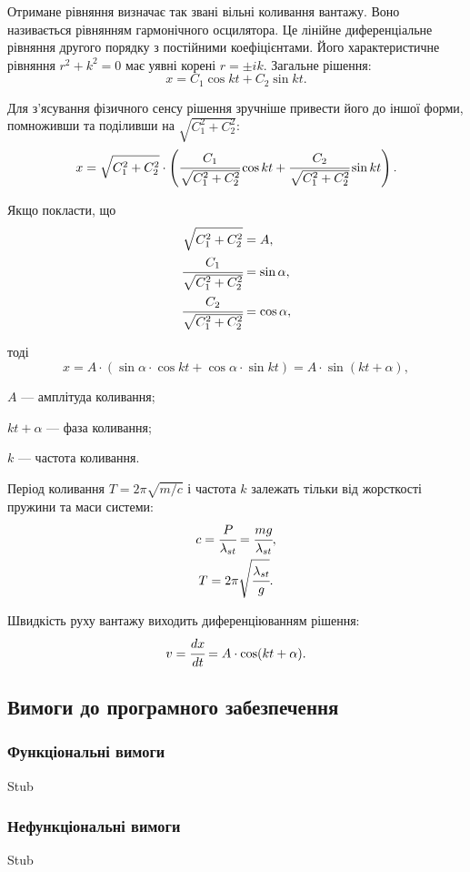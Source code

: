 Отримане рівняння визначає так звані вільні коливання вантажу.
Воно називається рівнянням гармонічного осцилятора.
Це лінійне диференціальне рівняння другого порядку з постійними коефіцієнтами.
Його характеристичне рівняння $r^2 + k^2 = 0$ має уявні корені $r=\pm ik$.
Загальне рішення:
\[
x = C_1 \cos kt + C_2 \sin kt.
\]

Для з'ясування фізичного сенсу рішення зручніше привести його до іншої форми, помноживши та поділивши на $\sqrt{C_1^2 + C_2^2}$:
\[
x = \sqrt{C_1^2 + C_2^2} \cdot \left( \cfrac{C_1}{\sqrt{C_1^2 + C_2^2}} \cos kt + \cfrac{C_2}{\sqrt{C_1^2 + C_2^2}} \sin kt \right).
\]

Якщо покласти, що
\begin{align*}
\sqrt{C_1^2 + C_2^2} &= A, \\
\cfrac{C_1}{\sqrt{C_1^2 + C_2^2}} &= \sin \alpha, \\
\cfrac{C_2}{\sqrt{C_1^2 + C_2^2}} &= \cos \alpha,
\end{align*}

тоді
\[
x = A \cdot (\sin\alpha \cdot \cos kt + \cos\alpha \cdot \sin kt) = A \cdot \sin (kt + \alpha),
\]
\begin{description}
\item[де] $A$ --- амплітуда коливання;
\item $kt + \alpha$ --- фаза коливання;
\item $k$ --- частота коливання.
\end{description}

Період коливання $T=2\pi\sqrt{m/c}$ і частота $k$ залежать тільки від жорсткості пружини та маси системи:
\begin{gather*}
c = \cfrac{P}{\lambda_{st}} = \cfrac{mg}{\lambda_{st}}, \\
T = 2\pi \sqrt{\cfrac{\lambda_{st}}{g}}.
\end{gather*}

Швидкість руху вантажу виходить диференціюванням рішення:
\[
v=\cfrac{dx}{dt}=A\cdot\cos(kt+\alpha).
\]

\subsection{Вимоги до програмного забезпечення}
\subsubsection{Функціональні вимоги}
Stub

\subsubsection{Нефункціональні вимоги}
Stub


